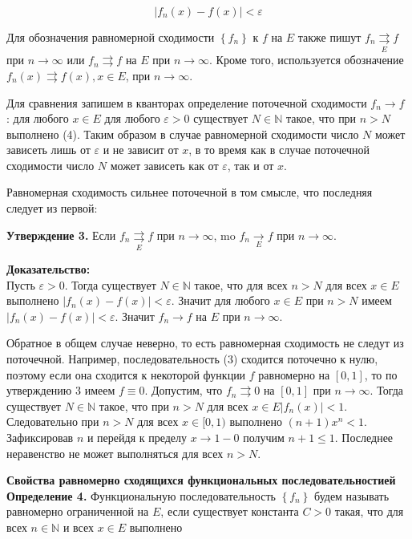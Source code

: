 \documentclass[a4paper,12pt]{article} %
\begin{document}
	$$
	\left|f_{n}(x)-f(x)\right|<\varepsilon
	$$
	
	Для обозначения равномерной сходимости $\left\{f_{n}\right\}$ к $f$ на $E$ также пишут $f_{n} \underset{E}{\rightrightarrows} f$ при $n \rightarrow \infty$ или $f_{n} \rightrightarrows f$ на $E$ при $n \rightarrow \infty$. Кроме того, используется обозначение $f_{n}(x) \rightrightarrows f(x), x \in E$, при $n \rightarrow \infty$.
	
	Для сравнения запишем в кванторах определение поточечной сходимости $f_{n} \rightarrow f$ : для любого $x \in E$ для любого $\varepsilon>0$ существует $N \in \mathbb{N}$ такое, что при $n>N$ выполнено (4). Таким образом в случае равномерной сходимости число $N$ может зависеть лишь от $\varepsilon$ и не зависит от $x$, в то время как в случае поточечной сходимости число $N$ может зависеть как от $\varepsilon$, так и от $x$.
	
	Равномерная сходимость сильнее поточечной в том смысле, что последняя следует из первой:
	
	\textbf{Утверждение 3.} Если $f_{n} \underset{E}{\rightrightarrows} f$ при $n \rightarrow \infty$, mo $f_{n} \underset{E}{\rightarrow} f$ при $n \rightarrow \infty$.
	
	\textbf{Доказательство:\\}
	Пусть $\varepsilon>0$. Тогда существует $N \in \mathbb{N}$ такое, что для всех $n>N$ для всех $x \in E$ выполнено $\left|f_{n}(x)-f(x)\right|<\varepsilon$. Значит для любого $x \in E$ при $n>N$ имеем $\left|f_{n}(x)-f(x)\right|<\varepsilon$. Значит $f_{n} \rightarrow f$ на $E$ при $n \rightarrow \infty$.
	
	Обратное в общем случае неверно, то есть равномерная сходимость не следут из поточечной. Например, последовательность (3) сходится поточечно к нулю, поэтому если она сходится к некоторой функции $f$ равномерно на $[0,1]$, то по утверждению 3 имеем $f \equiv 0$. Допустим, что $f_{n} \rightrightarrows 0$ на $[0,1]$ при $n \rightarrow \infty$. Тогда существует $N \in \mathbb{N}$ такое, что при $n>N$ для всех $x \in E\left|f_{n}(x)\right|<1$. Следовательно при $n>N$ для всех $x \in[0,1)$ выполнено $(n+1) x^{n}<1$. Зафиксировав $n$ и перейдя к пределу $x \rightarrow 1-0$ получим $n+1 \leq 1$. Последнее неравенство не может выполняться для всех $n>N$.
	
	\textbf{Свойства равномерно сходящихся функциональных последовательностией}\\
	\textbf{Определение 4.} Функциональную последовательность $\left\{f_{n}\right\}$ будем называть равномерно ограниченной на $E$, если существует константа $C>0$ такая, что для всех $n \in \mathbb{N}$ и всех $x \in E$ выполнено
	
\end{document}
